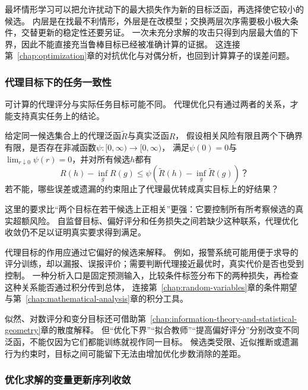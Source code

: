 最坏情形学习可以把允许扰动下的最大损失作为新的目标泛函，再选择使它较小的候选。
内层是在找最不利情形，外层是在改模型；交换两层次序需要极小极大条件，交替更新的稳定性还要另证。
一次未充分求解的攻击只得到内层最大值的下界，因此不能直接充当鲁棒目标已经被准确计算的证据。
这连接第~\ref{chap:optimization}章的对抗优化与对偶分析，也回到计算算子的误差问题。

\subsubsection{代理目标下的任务一致性}
\label{sec:future-analysis-proxy-risk}

可计算的代理评分与实际任务目标可能不同。
代理优化只有通过两者的关系，才能支持真实任务上的结论。

\begin{mathproblem}[代理泛函能否支持真实目标]
  \label{question:future-proxy-risk}
  给定同一候选集合上的代理泛函$\widetilde R$与真实泛函$R$，
  假设相关风险有限且两个下确界有限，是否存在非减函数$\psi:[0,\infty)\to[0,\infty)$，
  满足$\psi(0)=0$与$\lim_{r\downarrow0}\psi(r)=0$，并对所有候选$h$都有
  \[
    R(h)-\inf_gR(g)
    \leq\psi\!\left(\widetilde R(h)-\inf_g\widetilde R(g)\right)\text{？}
  \]
  若不能，哪些误差或遗漏的约束阻止了代理最优转成真实目标上的好结果？
\end{mathproblem}

这里的要求比“两个目标在若干候选上正相关”更强：它要控制所有所考察候选的真实超额风险。
自监督目标、偏好评分和任务损失之间若缺少这种联系，代理优化收敛仍不足以证明真实要求得到满足。

代理目标的作用应通过它偏好的候选来解释。
例如，报警系统可能用便于求导的评分训练，却以漏报、误报评价；需要判断代理接近最优时，真实代价是否也受到控制。
一种分析入口是固定预测输入，比较条件标签分布下的两种损失，再检查这种关系能否通过积分传到总体，
连接第~\ref{chap:random-variables}章的条件期望与第~\ref{chap:mathematical-analysis}章的积分工具。

似然、对数评分和变分目标还可借助第~\ref{chap:information-theory-and-statistical-geometry}章的散度解释。
但“优化下界”“拟合教师”“提高偏好评分”分别改变不同泛函，不能仅因为它们都能训练就视作同一目标。
候选类受限、近似推断或遗漏行为约束时，目标之间可能留下无法由增加优化步数消除的差距。

\subsubsection{优化求解的变量更新序列收敛}
\label{sec:future-analysis-convergence}

